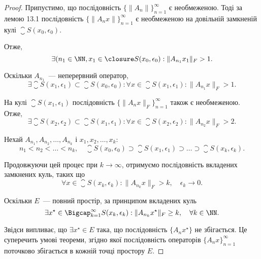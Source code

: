 \begin{proof}
Припустимо, що послідовність $\{\|A_n\|\}_{n = 1}^\infty$ є необмеженою.
Тоді за лемою 13.1 послідовність $\{\|A_n x\|\}_{n = 1}^\infty$
є необмеженою на довільній замкненій кулі $\closure S(x_0, \epsilon_0)$.

Отже, 
\begin{equation*}
    \exists (n_1 \in \NN, x_1 \in \closure S(x_0, \epsilon_0): \|A_{n_1} x_1\|_F > 1.    
\end{equation*}

Оскільки $A_{n_1}$~--- неперервний оператор,
\begin{equation*}
    \exists \closure S(x_1, \epsilon_1) \subset \closure S(x_0, \epsilon_0):
    \forall x \in \closure S(x_1, \epsilon_1): \|A_{n_1} x\|_F > 1.
\end{equation*}

На кулі $\closure S(x_1, \epsilon_1)$ послідовність $\{\|A_n x\|_F\}_{n = 1}^\infty$
також є необмеженою. Отже,
\begin{equation*}
    \exists \closure S(x_2, \epsilon_2) \subset \closure S(x_1, \epsilon_1):
    \forall x \in \closure S(x_2, \epsilon_2): \|A_{n_2} x\|_F > 2.
\end{equation*}

Нехай $A_{n_1}, A_{n_2}, \dots, A_{n_k}$ і $x_1, x_2, \dots, x_k$:
\begin{equation*}
    n_1 < n_2 < \dots < n_k, \quad
    \closure S(x_0, \epsilon_0) \supset 
    \closure S(x_1, \epsilon_1) \supset
    \dots \supset \closure S(x_k, \epsilon_k).
\end{equation*}

Продовжуючи цей процес при $k \to \infty$, отримуємо
послідовність вкладених замкнених куль, таких що
\begin{equation*}
    \forall x \in \closure S(x_k, \epsilon_k): \|A_{n_k} x\|_F > k, \quad \epsilon_k \to 0.
\end{equation*}

Оскільки $E$~--- повний простір, за принципом вкладених куль
\begin{equation*}
    \exists x^\star \in \Bigcap_{k = 1}^\infty S(x_k, \epsilon_k):
    \|A_{n_k} x^\star\|_F \ge k, \quad \forall k \in \NN.
\end{equation*}

Звідси випливає, що $\exists x^\star \in E$ така, що послідовність $\{A_n x^\star\}$
не збігається. Це суперечить умові теореми, згідно якої
послідовність операторів $\{A_n x\}_{n = 1}^\infty$
поточково збігається в кожній точці простору $E$.


\end{proof}
